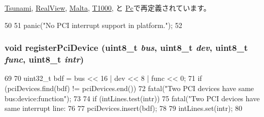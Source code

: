 \hyperlink{classTsunami_a545d1445357706d7259aa73104f44222}{Tsunami}, \hyperlink{classRealView_a545d1445357706d7259aa73104f44222}{RealView}, \hyperlink{classMalta_a545d1445357706d7259aa73104f44222}{Malta}, \hyperlink{classT1000_a545d1445357706d7259aa73104f44222}{T1000}, と \hyperlink{classPc_a545d1445357706d7259aa73104f44222}{Pc}で再定義されています。


\begin{DoxyCode}
50 {
51    panic("No PCI interrupt support in platform.");
52 }
\end{DoxyCode}
\hypertarget{classPlatform_a04c0d51f5dc49c970da514b7e8f46c14}{
\subsubsection[{registerPciDevice}]{\setlength{\rightskip}{0pt plus 5cm}void registerPciDevice (uint8\_\-t {\em bus}, \/  uint8\_\-t {\em dev}, \/  uint8\_\-t {\em func}, \/  uint8\_\-t {\em intr})}}
\label{classPlatform_a04c0d51f5dc49c970da514b7e8f46c14}



\begin{DoxyCode}
69 {
70     uint32_t bdf = bus << 16 | dev << 8 | func << 0;
71     if (pciDevices.find(bdf) != pciDevices.end())
72         fatal("Two PCI devices have same bus:device:function\n");
73 
74     if (intLines.test(intr))
75         fatal("Two PCI devices have same interrupt line: %
76 
77     pciDevices.insert(bdf);
78 
79     intLines.set(intr);
80 }
\end{DoxyCode}



